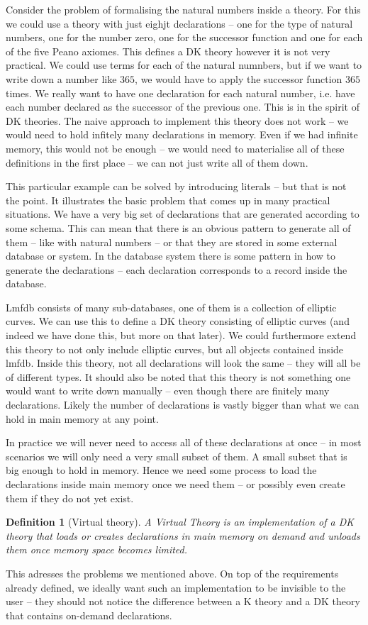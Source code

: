 \documentclass{deliverablereport}
\newtheorem{mydef}{Definition}
\begin{document}
Consider the problem of formalising the natural numbers inside a theory. For this we could use a theory with just eighjt declarations -- one for the type of natural numbers, one for the number zero, one for the successor function and one for each of the five Peano axiomes. This defines a DK theory however it is not very practical. We could use terms for each of the natural numnbers, but if we want to write down a number like $365$, we would have to apply the successor function $365$ times. We really want to have one declaration for each natural number, i.e. have each number declared as the successor of the previous one. This is in the spirit of DK theories. The naive approach to implement this theory does not work -- we would need to hold infitely many declarations in memory. Even if we had infinite memory, this would not be enough -- we would need to materialise all of these definitions in the first place -- we can not just write all of them down.

This particular example can be solved by introducing literals -- but that is not the point. It illustrates the basic problem that comes up in many practical situations. We have a very big set of declarations that are generated according to some schema. This can mean that there is an obvious pattern to generate all of them -- like with natural numbers -- or that they are stored in some external database or system. In the database system there is some pattern in how to generate the declarations -- each declaration corresponds to a record inside the database.

Lmfdb consists of many sub-databases, one of them is a collection of elliptic curves. We can use this to define a DK theory consisting of elliptic curves (and indeed we have done this, but more on that later). We could furthermore extend this theory to not only include elliptic curves, but all objects contained inside lmfdb. Inside this theory, not all declarations will look the same -- they will all be of different types. It should also be noted that this theory is not something one would want to write down manually -- even though there are finitely many declarations. Likely the number of declarations is vastly bigger than what we can hold in main memory at any point.

In practice we will never need to access all of these declarations at once -- in most scenarios we will only need a very small subset of them. A small subset that is big enough to hold in memory. Hence we need some process to load the declarations inside main memory once we need them -- or possibly even create them if they do not yet exist.
\begin{mydef}[Virtual theory]
  A Virtual Theory is an implementation of a DK theory that loads or creates declarations in main memory on demand and unloads them once memory space becomes limited.
\end{mydef}
This adresses the problems we mentioned above. On top of the requirements already defined, we ideally want such an implementation to be invisible to the user -- they should not notice the difference between a K theory and a DK theory that contains on-demand declarations.
\end{document}

